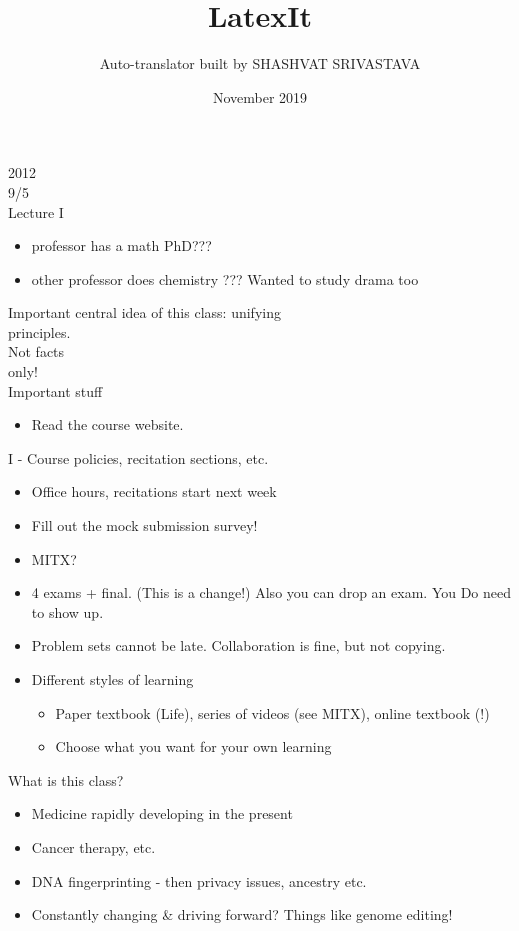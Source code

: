 \documentclass{article}
\title{LatexIt}
\author{Auto-translator built by SHASHVAT SRIVASTAVA}
\date{November 2019}
\begin{document}
2012\\
9/5\\
Lecture I
\begin{itemize}
\item  professor has a math PhD???
\item  other professor does chemistry ??? Wanted to study drama too
\end{itemize}
Important central idea of this class: unifying\\
principles.\\
Not facts\\
only!\\
Important stuff
\begin{itemize}
\item  Read the course website.
\end{itemize}
I - Course policies, recitation sections, etc.
\begin{itemize}
\item  Office hours, recitations start next week
\item  Fill out the mock submission survey!
\end{itemize}
\begin{itemize}
\item  MITX?
\end{itemize}
\begin{itemize}
\item 4 exams + final. (This is a change!) Also you can drop an exam.
You Do need to show up.
\end{itemize}
\begin{itemize}
\item  Problem sets cannot be late. Collaboration is fine, but not copying.
\item  Different styles of learning
\begin{itemize}
\item  Paper textbook (Life), series of videos (see MITX), online textbook (!)
\item  Choose what you want for your own learning
\end{itemize}
\end{itemize}
What is this class?
\begin{itemize}
\item  Medicine rapidly developing in the present
\end{itemize}
\begin{itemize}
\item  Cancer therapy, etc.
\item  DNA fingerprinting - then privacy issues, ancestry etc.
\item  Constantly changing \& driving forward? Things like genome editing!
\end{itemize}
\end{document}
